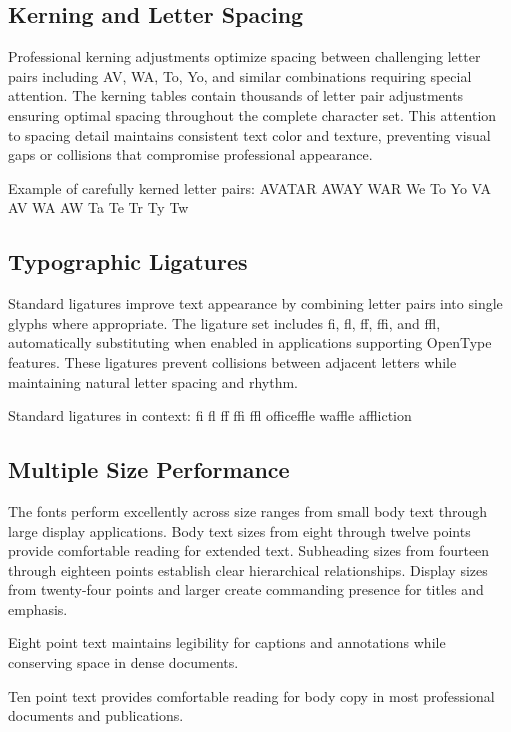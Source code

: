 \documentclass[11pt,letterpaper]{article}
\begin{document}
\subsection{Kerning and Letter Spacing}

Professional kerning adjustments optimize spacing between challenging letter pairs including AV, WA, To, Yo, and similar combinations requiring special attention. The kerning tables contain thousands of letter pair adjustments ensuring optimal spacing throughout the complete character set. This attention to spacing detail maintains consistent text color and texture, preventing visual gaps or collisions that compromise professional appearance.

Example of carefully kerned letter pairs: AVATAR AWAY WAR We To Yo VA AV WA AW Ta Te Tr Ty Tw

\subsection{Typographic Ligatures}

Standard ligatures improve text appearance by combining letter pairs into single glyphs where appropriate. The ligature set includes fi, fl, ff, ffi, and ffl, automatically substituting when enabled in applications supporting OpenType features. These ligatures prevent collisions between adjacent letters while maintaining natural letter spacing and rhythm.

Standard ligatures in context: fi fl ff ffi ffl officeffle waffle affliction

\subsection{Multiple Size Performance}

The fonts perform excellently across size ranges from small body text through large display applications. Body text sizes from eight through twelve points provide comfortable reading for extended text. Subheading sizes from fourteen through eighteen points establish clear hierarchical relationships. Display sizes from twenty-four points and larger create commanding presence for titles and emphasis.

{\fontsize{8}{10}\selectfont Eight point text maintains legibility for captions and annotations while conserving space in dense documents.}

{\fontsize{10}{12}\selectfont Ten point text provides comfortable reading for body copy in most professional documents and publications.}
\end{document}
